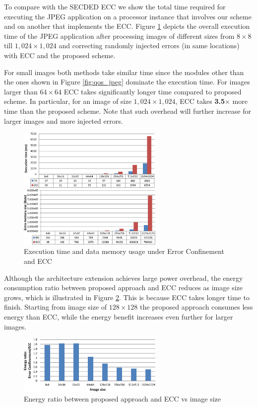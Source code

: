 To compare with the SECDED ECC we show the total time required for executing the JPEG application on a processor instance that involves our scheme and on another that implements the ECC. Figure \ref{fig:qos_time_size} depicts the overall execution time of the JPEG application after processing images of different sizes from $8 \times 8$ till $1,024 \times 1,024$ and correcting randomly injected errors (in same locations) with ECC and the proposed scheme.

For small images both methods take similar time since the modules other than the ones shown in Figure \ref{fig:qos_jpeg} dominate the execution time. For images larger than $64 \times 64$ ECC takes significantly longer time compared to proposed scheme. In particular, for an image of size $1,024 \times 1,024$, ECC takes \textbf{3.5}$\times$ more time than the proposed scheme. Note that such overhead will further increase for larger images and more injected errors. 

\begin{figure}
\centering
\includegraphics[width=70mm]{./eps/qos_time_size}
\caption{Execution time and data memory usage under Error Confinement and ECC}
\vspace{-4mm}
\label{fig:qos_time_size}
\end{figure}

Although the architecture extension achieves large power overhead, the energy consumption ratio between proposed approach and ECC reduces as image size grows, which is illustrated in Figure \ref{fig:qos_energy}. This is because ECC takes longer time to finish. Starting from image size of $128 \times 128$ the proposed approach consumes less energy than ECC, while the energy benefit increases even further for larger images.

\begin{figure}[hbt]
\centering
\includegraphics[width=70mm]{./eps/qos_energy}
\caption{Energy ratio between proposed approach and ECC vs image size}
\vspace{-4mm}
\label{fig:qos_energy}
\end{figure}

